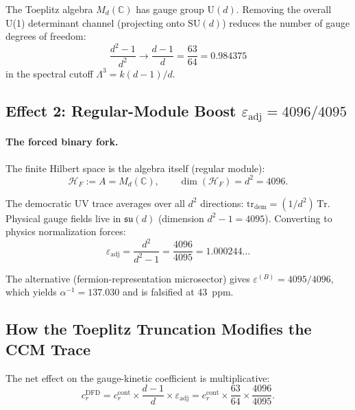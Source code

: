 \documentclass[12pt,a4paper]{article}
\begin{document}
The Toeplitz algebra $M_d(\mathbb{C})$ has gauge group
$\mathrm{U}(d)$.  Removing the overall U(1) determinant channel
(projecting onto $\mathrm{SU}(d)$) reduces the number of gauge degrees
of freedom:
\begin{equation}\label{eq:traceless}
\frac{d^2 - 1}{d^2} \to \frac{d-1}{d} = \frac{63}{64} = 0.984375
\end{equation}
in the spectral cutoff $\Lambda^3 = k(d-1)/d$.

\subsection{Effect 2: Regular-Module Boost $\varepsilon_{\mathrm{adj}} = 4096/4095$}

\paragraph{The forced binary fork.}
The finite Hilbert space is the algebra itself (regular module):
\begin{equation}
\mathcal{H}_F := A = M_d(\mathbb{C}), \qquad \dim(\mathcal{H}_F) = d^2 = 4096.
\end{equation}

The democratic UV trace averages over all $d^2$ directions:
$\mathrm{tr}_{\mathrm{dem}} = (1/d^2)\,\mathrm{Tr}$.
Physical gauge fields live in $\mathfrak{su}(d)$ (dimension $d^2 - 1 = 4095$).
Converting to physics normalization forces:
\begin{equation}\label{eq:boost}
\varepsilon_{\mathrm{adj}} = \frac{d^2}{d^2 - 1}
= \frac{4096}{4095} = 1.000244\ldots
\end{equation}

The alternative (fermion-representation microsector) gives
$\varepsilon^{(B)} = 4095/4096$, which yields $\alpha^{-1} = 137.030$
and is falsified at 43~ppm.

\subsection{How the Toeplitz Truncation Modifies the CCM Trace}

The net effect on the gauge-kinetic coefficient is multiplicative:
\begin{equation}\label{eq:toeplitz-modification}
c_r^{\mathrm{DFD}} = c_r^{\mathrm{cont}} \times
\frac{d-1}{d} \times \varepsilon_{\mathrm{adj}}
= c_r^{\mathrm{cont}} \times \frac{63}{64} \times \frac{4096}{4095}.
\end{equation}
\end{document}
